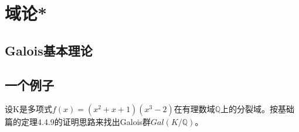 \section{域论*}
\subsection{Galois基本理论}
\subsection{一个例子}

\begin{example}
	设K是多项式$f(x)=(x^{2}+x+1)(x^{3}-2)$在有理数域$\mathbb{Q}$上的分裂域。按基础篇的定理4.4.9的证明思路来找出Galois群$Gal(K/\mathbb{Q})$。
\end{example}
